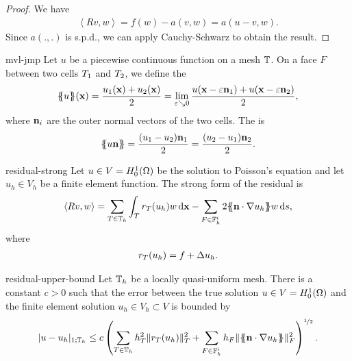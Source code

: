 \begin{proof}
  We have
  \begin{gather}
    \left<Rv,w\right>
    = f(w) - a(v,w)
    = a(u-v,w).
  \end{gather}
  Since $a(.,.)$ is s.p.d., we can apply Cauchy-Schwarz to obtain the result.
\end{proof}

\begin{Definition}{mvl-jmp}
  Let $u$ be a piecewise continuous function on a mesh $\mathbb T$. On a
  face $F$ between two cells $T_1$ and $T_2$, we define the
  \begin{gather}
    \{\!\!\{u\}\!\!\}(\mathbf x) = \frac{u_1(\mathbf x) + u_2(\mathbf x)}2
    = \lim_{\varepsilon\searrow 0}
    \frac{u(\mathbf x-\varepsilon \mathbf n_1) + u(\mathbf x - \varepsilon\mathbf n_2)}2,
  \end{gather}
  where $\mathbf n_i$ are the outer normal vectors of the two cells. The
   is
  \begin{gather}
    \{\!\!\{u\mathbf n\}\!\!\} = \frac{(u_1-u_2)\mathbf n_1}2 = \frac{(u_2-u_1)\mathbf n_2}2.
  \end{gather}
\end{Definition}
\begin{Definition}{residual-strong}
  Let $u\in V=H^1_0(\Omega)$ be the solution to Poisson's equation
  and let $u_h\in V_h$ be a finite element function.  The strong form
  of the residual is
  \begin{gather}
    \left<Rv,w\right> = \sum_{T\in\mathbb T_h}\int_{T} r_T(u_h) w\,\mathrm{d} \mathbf x
    - \sum_{F\in \mathbb F_h^i} 2\{\!\!\{\mathbf n\cdot\nabla u_h\}\!\!\} w\,\mathrm{d} s,
  \end{gather}
  where
  \begin{gather}
    r_T(u_h) = f + \Delta u_h.
  \end{gather}
\end{Definition}

\begin{Theorem}{residual-upper-bound}
  Let $\mathbb T_h$ be a locally quasi-uniform mesh.
  There is a constant $c>0$ such that the error between the true
  solution $u\in V=H^1_0(\Omega)$ and the finite element solution
  $u_h\in V_h \subset V$ is bounded by
  \begin{gather}
    \lvert u-u_h\rvert_{1;\mathbb T_h} \le c \left(
      \sum_{T\in\mathbb T_h} h_T^2 \lVert r_T(u_h)\rVert_T^2
      + \sum_{F\in \mathbb F_h^i} h_F
      \lVert\{\!\!\{\mathbf n\cdot\nabla u_h\}\!\!\}\rVert_F^2
    \right)^{\nicefrac12}.
  \end{gather}
\end{Theorem}

